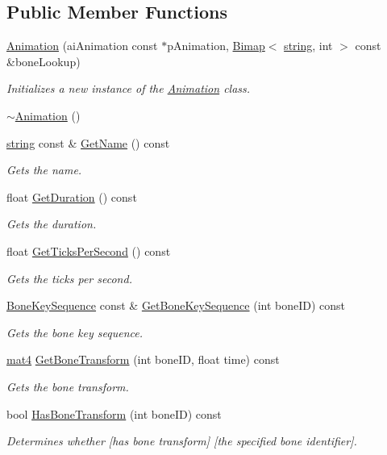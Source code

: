 \subsection*{Public Member Functions}
\begin{DoxyCompactItemize}
\item 
\hyperlink{class_animation_af4a62f49466ad950d2134ec8db003777}{Animation} (ai\+Animation const $\ast$p\+Animation, \hyperlink{class_bimap}{Bimap}$<$ \hyperlink{_types_8h_ad453f9f71ce1f9153fb748d6bb25e454}{string}, int $>$ const \&bone\+Lookup)
\begin{DoxyCompactList}\small\item\em Initializes a new instance of the \hyperlink{class_animation}{Animation} class. \end{DoxyCompactList}\item 
\hyperlink{class_animation_a401b68793d4fbf48d481c030ee4b2a16}{$\sim$\+Animation} ()
\item 
\hyperlink{_types_8h_ad453f9f71ce1f9153fb748d6bb25e454}{string} const \& \hyperlink{class_animation_abde46b2060b07d55958d1aad03291891}{Get\+Name} () const 
\begin{DoxyCompactList}\small\item\em Gets the name. \end{DoxyCompactList}\item 
float \hyperlink{class_animation_aa6f41b8a36928b2ea0a45f1ab711f988}{Get\+Duration} () const 
\begin{DoxyCompactList}\small\item\em Gets the duration. \end{DoxyCompactList}\item 
float \hyperlink{class_animation_a6db85fc750b517c596e06620080c864a}{Get\+Ticks\+Per\+Second} () const 
\begin{DoxyCompactList}\small\item\em Gets the ticks per second. \end{DoxyCompactList}\item 
\hyperlink{class_bone_key_sequence}{Bone\+Key\+Sequence} const \& \hyperlink{class_animation_a05bf490bf9e0903d027b28d393d31f4f}{Get\+Bone\+Key\+Sequence} (int bone\+ID) const 
\begin{DoxyCompactList}\small\item\em Gets the bone key sequence. \end{DoxyCompactList}\item 
\hyperlink{_types_8h_a2db59f395fe82a7394c6324956c265d8}{mat4} \hyperlink{class_animation_ae41ca205ccc04bfd62ea8df3531871b5}{Get\+Bone\+Transform} (int bone\+ID, float time) const 
\begin{DoxyCompactList}\small\item\em Gets the bone transform. \end{DoxyCompactList}\item 
bool \hyperlink{class_animation_a0c648eb3fe2e493dcd8748b9e3fd25de}{Has\+Bone\+Transform} (int bone\+ID) const 
\begin{DoxyCompactList}\small\item\em Determines whether \mbox{[}has bone transform\mbox{]} \mbox{[}the specified bone identifier\mbox{]}. \end{DoxyCompactList}\end{DoxyCompactItemize}
